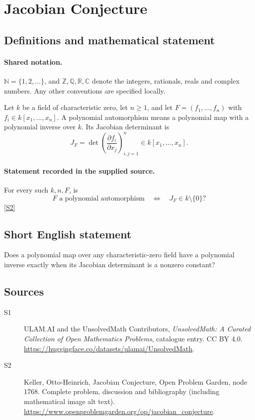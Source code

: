 \documentclass[11pt]{book}
\newcommand{\sref}[2]{\hyperlink{source:#1:#2}{[S#2]}}
\begin{document}
\section{Jacobian Conjecture}\label{statement}

\subsection{Definitions and mathematical statement}

\paragraph{Shared notation.}$\mathbb N=\{1,2,\ldots\}$, and $\mathbb Z,\mathbb Q,\mathbb R,\mathbb C$ denote the integers, rationals, reals and complex numbers. Any other conventions are specified locally.


Let $k$ be a field of characteristic zero, let $n\geq1$, and let $F=(f_1,\ldots,f_n)$ with $f_i\in k[x_1,\ldots,x_n]$. A polynomial automorphism means a polynomial map with a polynomial inverse over $k$. Its Jacobian determinant is
\[J_F=\det\left(\frac{\partial f_i}{\partial x_j}\right)_{i,j=1}^n\in k[x_1,\ldots,x_n].\]
\paragraph{Statement recorded in the supplied source.}
For every such $k,n,F$, is
\[F\text{ a polynomial automorphism}\quad\Longleftrightarrow\quad J_F\in k\setminus\{0\}?\] \sref{statement}{2}
\subsection{Short English statement}
Does a polynomial map over any characteristic-zero field have a polynomial inverse exactly when its Jacobian determinant is a nonzero constant?
\subsection{Sources}
\begin{description}
\item[\hypertarget{source:statement:1}{S1}] ULAM.AI and the UnsolvedMath Contributors, \emph{UnsolvedMath: A Curated Collection of Open Mathematics Problems}, catalogue entry. CC BY 4.0. \url{https://huggingface.co/datasets/ulamai/UnsolvedMath}.
\item[\hypertarget{source:statement:2}{S2}] Keller, Otto-Heinrich, Jacobian Conjecture, Open Problem Garden, node 1768. Complete problem, discussion and bibliography (including mathematical image alt text). \url{https://www.openproblemgarden.org/op/jacobian_conjecture}.
\end{description}
\label{end:statement}
\end{document}
